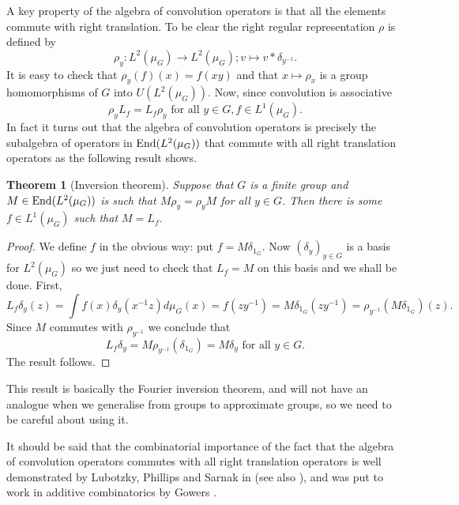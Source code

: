 \documentclass[12pt]{amsart}
\numberwithin{equation}{section}
\theoremstyle{plain}
\newtheorem{theorem}[subsection]{Theorem}
\theoremstyle{definition}
\providecommand{\End}{\mathop{\rm End}\nolimits}
\begin{document}
A key property of the algebra of convolution operators is that all the elements commute with right translation. To be clear the right regular representation $\rho$ is defined by
\begin{equation*}
\rho_y:L^2(\mu_G) \rightarrow L^2(\mu_G);v \mapsto v \ast \delta_{y^{-1}}. 
\end{equation*}
It is easy to check that $\rho_y(f)(x)=f(xy)$ and that $x \mapsto \rho_x$ is a group homomorphisms of $G$ into $U(L^2(\mu_G))$.  Now, since convolution is associative
\begin{equation*}
\rho_yL_f = L_f \rho_y \textrm{ for all } y \in G, f \in L^1(\mu_G).
\end{equation*}
In fact it turns out that the algebra of convolution operators is precisely the subalgebra of operators in $\End(L^2(\mu_G))$ that commute with all right translation operators as the following result shows.
\begin{theorem}[Inversion theorem]
Suppose that $G$ is a finite group and $M \in \End(L^2(\mu_G))$ is such that $M\rho_y = \rho_yM$ for all $y \in G$.  Then there is some $f \in L^1(\mu_G)$ such that $M=L_f$.
\end{theorem}
\begin{proof}
We define $f$ in the obvious way: put $f=M\delta_{1_G}$.  Now $(\delta_y)_{y \in G}$ is a basis for $L^2(\mu_G)$ so we just need to check that $L_f=M$ on this basis and we shall be done.  First,
\begin{equation*}
L_f\delta_y(z) = \int{f(x)\delta_y(x^{-1}z)d\mu_G(x)} = f(zy^{-1}) = M\delta_{1_G}(zy^{-1}) = \rho_{y^{-1}}(M\delta_{1_G})(z).
\end{equation*}
Since $M$ commutes with $\rho_{y^{-1}}$ we conclude that
\begin{equation*}
L_f\delta_y = M\rho_{y^{-1}}(\delta_{1_G})=M\delta_y \textrm{ for all }y\in G.
\end{equation*}
The result follows.
\end{proof}
This result is basically the Fourier inversion theorem, and will not have an analogue when we generalise from groups to approximate groups, so we need to be careful about using it.

It should be said that the combinatorial importance of the fact that the algebra of convolution operators commutes with all right translation operators is well demonstrated by Lubotzky, Phillips and Sarnak in \cite{ALRPPS} (see also \cite{GDPSAV}), and was put to work in additive combinatorics by Gowers \cite{WTGQ}.
\end{document}
